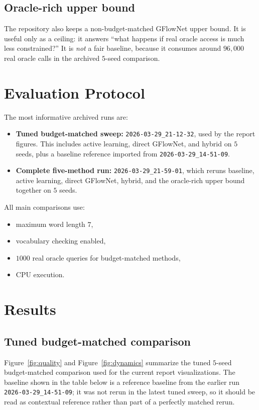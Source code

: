 \documentclass[10pt]{article}
\begin{document}
\subsection{Oracle-rich upper bound}
The repository also keeps a non-budget-matched GFlowNet upper bound. It is useful only as a ceiling: it answers ``what happens if real oracle access is much less constrained?'' It is \emph{not} a fair baseline, because it consumes around \(96{,}000\) real oracle calls in the archived \(5\)-seed comparison.

\section{Evaluation Protocol}
The most informative archived runs are:
\begin{itemize}
    \item \textbf{Tuned budget-matched sweep:} \texttt{2026-03-29\_21-12-32}, used by the report figures. This includes active learning, direct GFlowNet, and hybrid on \(5\) seeds, plus a baseline reference imported from \texttt{2026-03-29\_14-51-09}.
    \item \textbf{Complete five-method run:} \texttt{2026-03-29\_21-59-01}, which reruns baseline, active learning, direct GFlowNet, hybrid, and the oracle-rich upper bound together on \(5\) seeds.
\end{itemize}

All main comparisons use:
\begin{itemize}
    \item maximum word length \(7\),
    \item vocabulary checking enabled,
    \item \(1000\) real oracle queries for budget-matched methods,
    \item CPU execution.
\end{itemize}

\section{Results}
\subsection{Tuned budget-matched comparison}
Figure~\ref{fig:quality} and Figure~\ref{fig:dynamics} summarize the tuned \(5\)-seed budget-matched comparison used for the current report visualizations. The baseline shown in the table below is a reference baseline from the earlier run \texttt{2026-03-29\_14-51-09}; it was not rerun in the latest tuned sweep, so it should be read as contextual reference rather than part of a perfectly matched rerun.
\end{document}

